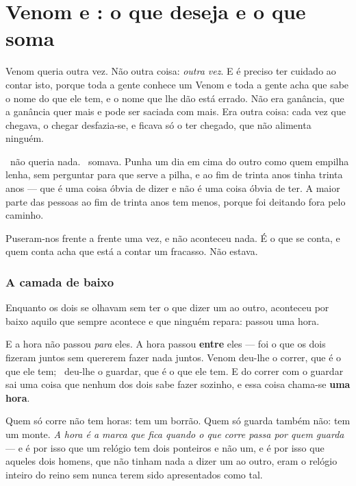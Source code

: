 \documentclass[livro.tex]{subfiles}
\begin{document}
\chapter{Venom e \Joa: o que deseja e o que soma}

Venom queria outra vez. Não outra coisa: \emph{outra vez}. E é preciso ter cuidado ao contar isto,
porque toda a gente conhece um Venom e toda a gente acha que sabe o nome do que ele tem, e o nome
que lhe dão está errado. Não era ganância, que a ganância quer mais e pode ser saciada com mais.
Era outra coisa: cada vez que chegava, o chegar desfazia-se, e ficava só o ter chegado, que não
alimenta ninguém.

\medskip

\Joa\ não queria nada. \Joa\ somava. Punha um dia em cima do outro como quem empilha lenha, sem
perguntar para que serve a pilha, e ao fim de trinta anos tinha trinta anos --- que é uma coisa
óbvia de dizer e não é uma coisa óbvia de ter. A maior parte das pessoas ao fim de trinta anos tem
menos, porque foi deitando fora pelo caminho.

\medskip

Puseram-nos frente a frente uma vez, e não aconteceu nada. É o que se conta, e quem conta acha que
está a contar um fracasso. Não estava.

\subsection*{A camada de baixo}

Enquanto os dois se olhavam sem ter o que dizer um ao outro, aconteceu por baixo aquilo que sempre
acontece e que ninguém repara: passou uma hora.

\medskip

E a hora não passou \emph{para} eles. A hora passou \textbf{entre} eles --- foi o que os dois
fizeram juntos sem quererem fazer nada juntos. Venom deu-lhe o correr, que é o que ele tem; \Joa\
deu-lhe o guardar, que é o que ele tem. E do correr com o guardar sai uma coisa que nenhum dos
dois sabe fazer sozinho, e essa coisa chama-se \textbf{uma hora}.

\medskip

Quem só corre não tem horas: tem um borrão. Quem só guarda também não: tem um monte. \emph{A hora
é a marca que fica quando o que corre passa por quem guarda} --- e é por isso que um relógio tem
dois ponteiros e não um, e é por isso que aqueles dois homens, que não tinham nada a dizer um ao
outro, eram o relógio inteiro do reino sem nunca terem sido apresentados como tal.
\end{document}
